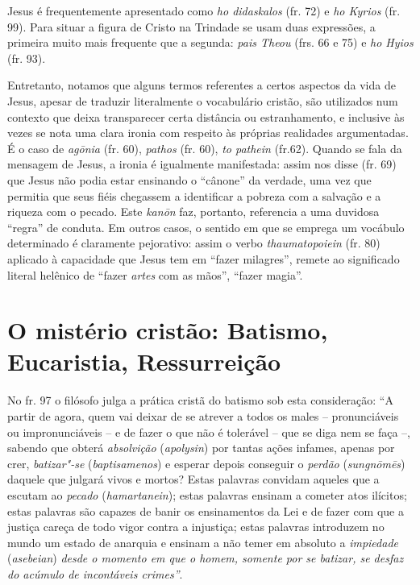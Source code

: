Jesus é frequentemente apresentado como \textit{ho didaskalos}
(fr. 72) e \textit{ho Kyrios}  (fr. 99). Para situar a figura de Cristo na Trindade se usam duas
expressões, a primeira muito mais frequente que a segunda:
\textit{pais Theou}
(frs. 66 e 75) e \textit{ho Hyios} (fr. 93).

Entretanto, notamos que alguns termos referentes a certos aspectos da
vida de Jesus, apesar de traduzir literalmente o vocabulário cristão,
são utilizados num contexto que deixa transparecer certa distância ou
estranhamento, e inclusive às vezes se nota uma clara ironia com
respeito às próprias realidades argumentadas. É o caso de \textit{agōnia}
(fr. 60), \textit{pathos} (fr. 60), \textit{to pathein} (fr.62). 
Quando se fala da mensagem de Jesus, a ironia é igualmente
manifestada: assim nos disse (fr. 69) que Jesus não podia estar
ensinando o “cânone” da verdade, uma vez que permitia que seus fiéis chegassem a
identificar a pobreza com a salvação e a riqueza com o pecado. Este
\textit{kanōn} faz, portanto,
referencia a uma duvidosa “regra” de conduta. Em outros casos, o
sentido em que se emprega um vocábulo determinado é claramente
pejorativo: assim o verbo
\textit{thaumatopoiein}
(fr. 80) aplicado à capacidade que Jesus tem em “fazer
milagres”, remete ao significado literal helênico de “fazer
\textit{artes} com as mãos”, “fazer magia”.

\section{O mistério cristão: Batismo, Eucaristia, Ressurreição} 

No fr. 97 o filósofo julga a prática cristã do batismo sob esta
consideração: “A partir de agora, quem vai deixar de se atrever a todos
os males -- pronunciáveis ou impronunciáveis -- e de fazer o que não é
tolerável -- que se diga nem se faça --, sabendo que obterá
\textit{absolvição}
(\textit{apolysin})
por tantas ações infames, apenas por crer, \textit{batizar"-se}
(\textit{baptisamenos})
e esperar depois conseguir o \textit{perdão}
(\textit{sungnōmēs})
daquele que julgará vivos e mortos? Estas palavras convidam aqueles que
a escutam ao \textit{pecado}
(\textit{hamartanein});
estas palavras ensinam a cometer atos ilícitos; estas palavras são
capazes de banir os ensinamentos da Lei e de fazer com que a justiça
careça de todo vigor contra a injustiça; estas palavras introduzem no
mundo um estado de anarquia e ensinam a não temer em absoluto a
\textit{impiedade}
(\textit{asebeian})
\textit{desde o momento em que o homem, somente por se batizar, se
desfaz do acúmulo de incontáveis crimes”}.

